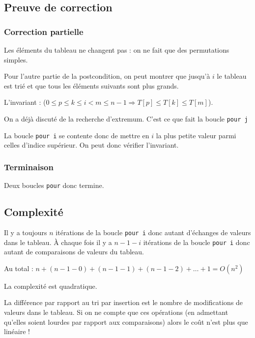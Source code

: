 \subsection{Preuve de correction}

\subsubsection{Correction partielle}

Les éléments du tableau ne changent pas : on ne fait que des permutations simples.

Pour l'autre partie de la postcondition, on peut montrer que jusqu'à $i$ le tableau est trié et que tous les éléments suivants sont plus grands.

L'invariant : ($0 \leqslant p \leqslant k \leqslant i < m \leqslant n-1 \Rightarrow T[p]\leqslant T[k]\leqslant T[m]$).

On a déjà discuté de la recherche d'extremum. C'est ce que fait la boucle \texttt{pour j}

La boucle \texttt{pour i} se contente donc de mettre en $i$ la plus petite valeur parmi celles d'indice supérieur. On peut donc vérifier l'invariant.

\subsubsection{Terminaison}

Deux boucles \texttt{pour} donc termine.

\subsection{Complexité}

Il y a toujours $n$ itérations de la boucle \texttt{pour i} donc autant d'échanges de valeurs dans le tableau. À chaque fois il y a $n-1-i$ itérations de la boucle \texttt{pour i} donc autant de comparaisons de valeurs du tableau.

Au total : $n+(n-1-0)+(n-1-1)+(n-1-2)+\ldots+1 = O(n^2)$

La complexité est quadratique.

\medskip

La différence par rapport au tri par insertion est le nombre de modifications de valeurs dans le tableau. Si on ne compte que ces opérations (en admettant qu'elles soient lourdes par rapport aux comparaisons) alors le coût n'est plus que linéaire !



